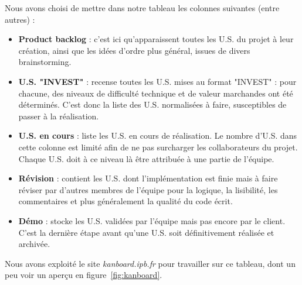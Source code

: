 Nous avons choisi de mettre dans notre tableau les colonnes suivantes (entre autres) :
\begin{itemize}
    \item \textbf{Product backlog} : c'est ici qu'apparaissent toutes les U.S. du projet à leur création, ainsi que les idées d'ordre plus général, issues de divers brainstorming.
    
    \item \textbf{U.S. "INVEST"} : recense toutes les U.S. mises au format "INVEST" : pour chacune, des niveaux de difficulté technique et de valeur marchandes ont été déterminés. C'est donc la liste des U.S. normalisées à faire, susceptibles de passer à la réalisation.
    
    \item \textbf{U.S. en cours} : liste les U.S. en cours de réalisation. Le nombre d'U.S. dans cette colonne est limité afin de ne pas surcharger les collaborateurs du projet. Chaque U.S. doit à ce niveau là être attribuée à une partie de l'équipe.
    
    \item \textbf{Révision} : contient les U.S. dont l'implémentation est finie mais à faire réviser par d'autres membres de l'équipe pour la logique, la lisibilité, les commentaires et plus généralement la qualité du code écrit.
    
    \item \textbf{Démo} : stocke les U.S. validées par l'équipe mais pas encore par le client. C'est la dernière étape avant qu'une U.S. soit définitivement réalisée et archivée.
\end{itemize}
Nous avons exploité le site \textit{kanboard.ipb.fr} pour travailler sur ce tableau, dont un peu voir un aperçu en figure~\ref{fig:kanboard}.

